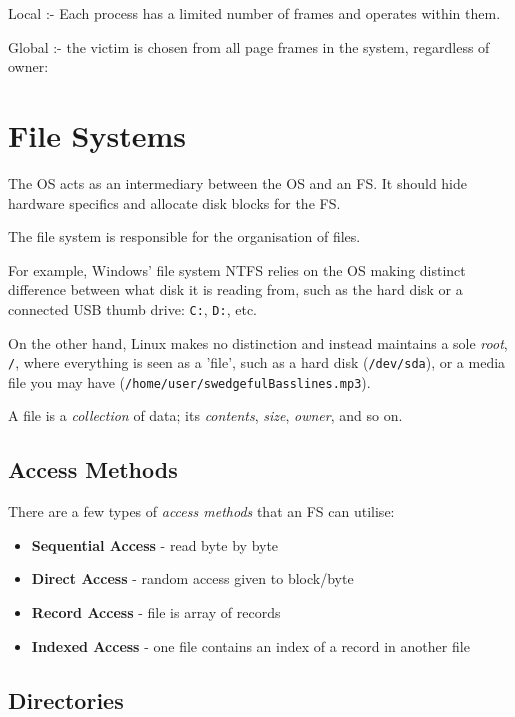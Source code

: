 \documentclass[a4]{article}
\begin{document}
Local :- Each process has a limited number of frames and operates within them.

Global :- the victim is chosen from all page frames in the system, regardless of owner:




\filbreak
\section{File Systems}

The OS acts as an intermediary between the OS and an FS. It should hide hardware specifics and allocate disk blocks for the FS.

The file system is responsible for the organisation of files.

For example, Windows' file system NTFS relies on the OS making distinct difference between what disk it is reading from, such as the hard disk or a connected USB thumb drive: \texttt{C:}, \texttt{D:}, etc.

On the other hand, Linux makes no distinction and instead maintains a sole \textit{root}, \texttt{/}, where everything is seen as a 'file', such as a hard disk (\texttt{/dev/sda}), or a media file you may have (\texttt{/home/user/swedgefulBasslines.mp3}).

A file is a \textit{collection} of data; its \textit{contents}, \textit{size}, \textit{owner}, and so on.

\subsection{Access Methods}

There are a few types of \textit{access methods} that an FS can utilise:

\begin{itemize}
\item
  \textbf{Sequential Access} - read byte by byte
\item
  \textbf{Direct Access} - random access given to block/byte
\item
  \textbf{Record Access} - file is array of records
\item
  \textbf{Indexed Access} - one file contains an index of a record in another file
\end{itemize}

\subsection{Directories}
\end{document}
